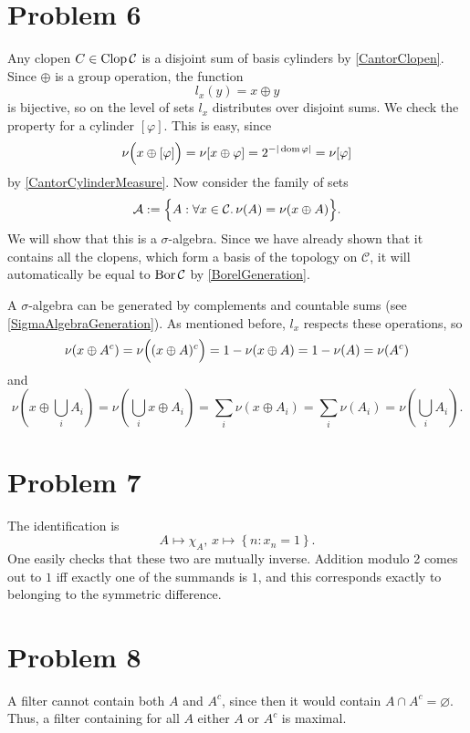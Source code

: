 \section*{Problem 6}

Any clopen \( C \in \operatorname{Clop} \mathcal{C} \) is a disjoint sum of basis cylinders by \ref{CantorClopen}. Since \( \oplus \) is a group operation, the function 
\[ 
    l_x(y) = x \oplus y 
\]
is bijective, so on the level of sets \( l_x \) distributes over disjoint sums. We check the property for a cylinder \( \left[ \varphi \right] \). This is easy, since
\[ 
    \nu \Bigl( x \oplus \left[ \varphi \right] \Bigr) = \nu[ x \oplus \varphi] = 2^{-|\operatorname{dom} \varphi|} = \nu [\varphi]
\]
by \ref{CantorCylinderMeasure}. Now consider the family of sets
\[ 
    \mathcal{A} := \Bigl\{ A : \forall x \in \mathcal{C}. \,\nu(A) = \nu(x \oplus A) \Bigr\}.
\]
We will show that this is a \( \sigma \)-algebra. Since we have already shown that it contains all the clopens, which form a basis of the topology on \( \mathcal{C} \), it will automatically be equal to \( \operatorname{Bor} \mathcal{C} \) by \ref{BorelGeneration}.

A \( \sigma \)-algebra can be generated by complements and countable sums (see \ref{SigmaAlgebraGeneration}). As mentioned before, \( l_x \) respects these operations, so
\[ 
    \nu(x\oplus A^c) = \nu \Bigl( (x \oplus A)^c \Bigr) = 1 - \nu(x \oplus A) = 1 - \nu(A) = \nu(A^c) 
\]
and
\[ 
    \nu \left( x \oplus \bigcup_i A_i \right) = \nu \left( \bigcup_i x \oplus A_i \right) = \sum_i \nu(x \oplus A_i) = \sum_i \nu(A_i) = \nu \left( \bigcup_i A_i \right).
\]

\section*{Problem 7}

The identification is
\[ 
    A \mapsto \chi_A,\, x \mapsto \left\{ n: x_n = 1 \right\}.
\]
One easily checks that these two are mutually inverse. Addition modulo 2 comes out to \( 1 \) iff exactly one of the summands is \( 1 \), and this corresponds exactly to belonging to the symmetric difference.

\section*{Problem 8}

A filter cannot contain both \( A \) and \( A^c \), since then it would contain \( A \cap A^c = \varnothing \). Thus, a filter containing for all \( A \) either \( A \) or \( A^c \) is maximal.


